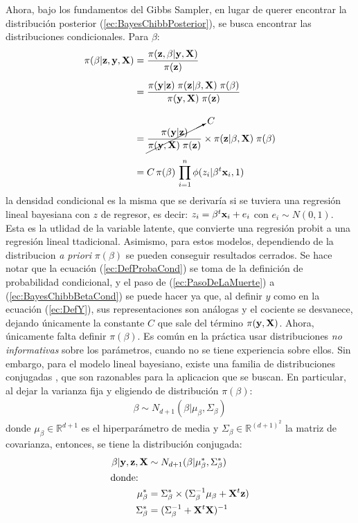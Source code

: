 \documentclass[../Main/Main.tex]{subfiles}
\begin{document}
Ahora, bajo los fundamentos del Gibbs Sampler, en lugar de querer encontrar la distribución posterior (\ref{ec:BayesChibbPosterior}), se busca encontrar las distribuciones condicionales. Para $\beta$:
\begin{align}
	\pi(\beta|\mathbf{z},\mathbf{y},\mathbf{X})
	& = \dfrac{\pi(\mathbf{z}, \beta| \mathbf{y}, \mathbf{X})}{\pi(\mathbf{z})} \label{ec:DefProbaCond}\\[5pt]
	& = \dfrac{\pi(\mathbf{y} | \mathbf{z})\;\pi(\mathbf{z}|\beta,\mathbf{X}) 
	\; \pi(\beta)}{\pi(\mathbf{y}, \mathbf{X}) \; \pi(\mathbf{z})} \nonumber \\[10pt]
	& = \cancelto{C}{\dfrac{\pi(\mathbf{y} | \mathbf{z})}{\pi(\mathbf{y}, \mathbf{X}) \; \pi(\mathbf{z})}} \times \pi(\mathbf{z}|\beta,\mathbf{X}) \; \pi(\beta) \label{ec:PasoDeLaMuerte} \\[5pt]
	& = C \,\pi(\beta) \, \prod_{i = 1}^n\phi(z_i|\beta^t\mathbf{x}_i,1) \label{ec:BayesChibbBetaCond}
\end{align}
la densidad condicional es la misma que se derivaría si se tuviera una regresión lineal bayesiana con $z$ de regresor, es decir: $z_i = \beta^t\mathbf{x}_i + e_i$ con $e_i \sim N(0,1)$. Esta es la utlidad de la variable latente, que convierte una regresión probit a una regresión lineal ttadicional. Asimismo, para estos modelos, dependiendo de la distribucion \textit{a priori} $\pi(\beta)$ se pueden conseguir resultados cerrados. Se hace notar que la ecuación (\ref{ec:DefProbaCond}) se toma de la definición de probabilidad condicional, y el paso de (\ref{ec:PasoDeLaMuerte}) a (\ref{ec:BayesChibbBetaCond}) se puede hacer ya que, al definir $y$ como en la ecuación (\ref{ec:DefY}), sus representaciones son análogas y el cociente se desvanece, dejando únicamente la constante $C$ que sale del término $\pi(\mathbf{y}, \mathbf{X})$. Ahora, únicamente falta definir $\pi(\beta)$. Es común en la práctica usar distribuciones \textit{no informativas} sobre los parámetros, cuando no se tiene experiencia sobre ellos. Sin embargo, para el modelo lineal bayesiano, existe una familia de distribuciones conjugadas \autocite{banerjee2008gory}, que son razonables para la aplicacion que se buscan. En particular, al dejar la varianza fija y eligiendo de distribución $\pi(\beta)$:
\begin{align}
	\beta \sim N_{d+1}(\beta|\mu_{\beta}, \Sigma_{\beta}) \label{ec:BetaAPriori}
\end{align}
donde $\mu_{\beta}\in \mathbb{R}^{d+1}$ es el hiperparámetro de media  y $\Sigma_{\beta} \in \mathbb{R}^{(d+1)^2}$ la matriz de covarianza,  entonces, se tiene la distribución conjugada:
\begin{align}
	\beta|\mathbf{y},\mathbf{z},\mathbf{X} &\sim N_{d+1}(\beta|\mu_\beta^*, \Sigma_\beta^*) 	\label{ec:SimBeta} \\
	\text{donde:}\quad& \nonumber \\
	 \mu_\beta^* &= \Sigma_\beta^* \times (\Sigma_\beta^{-1}\mu_\beta + \mathbf{X}^t\mathbf{z} )\nonumber \\
	 \Sigma_\beta^* &= (\Sigma_\beta^{-1} + \mathbf{X}^t\mathbf{X})^{-1}\nonumber
\end{align}
\end{document}
